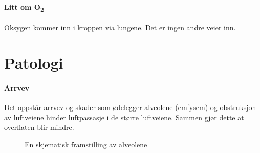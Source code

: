 				\paragraph{Litt om O\textsubscript{2}\\}
					Oksygen kommer inn i kroppen via lungene. Det er ingen andre veier inn. 
		\section{Patologi}
			\paragraph{Arrvev\\}
				Det oppstår arrvev og skader som ødelegger alveolene (emfysem) og obstruksjon av luftveiene hinder luftpassasje i de større luftveiene. Sammen gjør dette at overflaten blir mindre.
				\begin{figure}[ht]
                      \centering
                      \caption{En skjematisk framstilling av alveolene}%
                    \end{figure}
